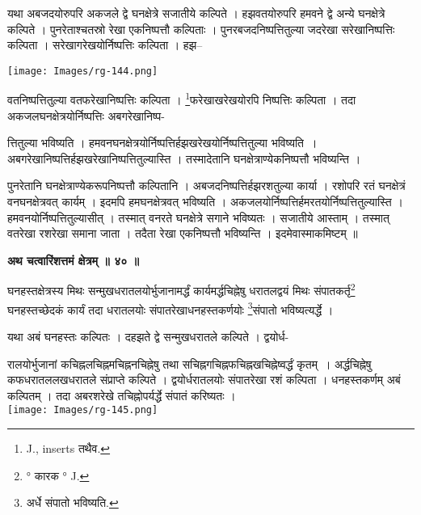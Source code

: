 \documentclass[11pt, openany]{book}
\begin{document}
यथा अबजदयोरुपरि अकजले द्वे घनक्षेत्रे सजातीये कल्पिते ।
हझवतयोरुपरि हमवने द्वे अन्ये घनक्षेत्रे कल्पिते ।
पुनरेताश्चतस्रो रेखा एकनिष्पत्तौ कल्पिताः । पुनरबजदनिष्पत्तितुल्या जदरेखा
सरेखानिष्पत्तिः कल्पिता । सरेखागरेखयोर्निष्पत्तिः कल्पिता । हझ--
\begin{center}
 \texttt{[image: Images/rg-144.png]}  
 \end{center} 
वतनिष्पत्तितुल्या वतफरेखानिष्पत्तिः कल्पिता ।
\renewcommand{\thefootnote}{१}\footnote{{\en J., inserts} तथैव.}फरेखाखरेखयोरपि
निष्पत्तिः कल्पिता । तदा अकजलघनक्षेत्रयोर्निष्पत्तिः अबगरेखानिष्प-

\newpage
\noindent त्तितुल्या भविष्यति । हमवनघनक्षेत्रयोर्निष्पत्तिर्हझखरेखयोर्निष्पत्तितुल्या भविष्यति~। अबगरेखानिष्पत्तिर्हझखरेखानिष्पत्तितुल्यास्ति ।
तस्मादेतानि घनक्षेत्राण्येकनिष्पत्तौ भविष्यन्ति ।\\
\vspace{3mm}

पुनरेतानि घनक्षेत्राण्येकरूपनिष्पत्तौ कल्पितानि । अबजदनिष्पत्तिर्हझरशतुल्या कार्या । रशोपरि रतं घनक्षेत्रं वनघनक्षेत्रवत् कार्यम् । इदमपि हमघनक्षेत्रवत् भविष्यति । अकजलयोर्निष्पत्तिर्हमरतयोर्निष्पत्तितुल्यास्ति । हमवनयोर्निष्पत्तितुल्यासीत् । तस्मात्
वनरते घनक्षेत्रे सगाने भविष्यतः । सजातीये आस्ताम् । तस्मात् वतरेखा रशरेखा समाना जाता । तदैता रेखा एकनिष्पत्तौ भविष्यन्ति । इदमेवास्माकमिष्टम् ॥\\
\vspace{3mm}

\begin{center}
\textbf{\large अथ चत्वारिंशत्तमं क्षेत्रम् ॥ ४० ॥}
\end{center}
\vspace{5mm}

{\ab घनहस्तक्षेत्रस्य मिथः सन्मुखधरातलयोर्भुजानामर्द्धं कार्यमर्द्धचिह्नेषु धरातलद्वयं मिथः संपातकर्तृ\renewcommand{\thefootnote}{१}\footnote{° कारक ° {\en J.}} घनहस्तच्छेदकं कार्यं तदा धरातलयोः संपातरेखाधनहस्तकर्णयोः \renewcommand{\thefootnote}{२}\footnote{अर्धे संपातो भविष्यति.}संपातो भविष्यत्यर्द्धे ।}\\
\vspace{3mm}

यथा अबं घनहस्तः कल्पितः । दहझते द्वे सन्मुखधरातले कल्पिते । द्वयोर्ध-
\begin{vwcol}[widths={0.6,0.4}, sep=.8cm, rule=0pt]
रालयोर्भुजानां कचिह्नलचिह्नमचिह्ननचिह्नेषु तथा सचिह्नगचिह्नफचिह्नखचिह्नेष्वर्द्धं कृतम्~। अर्द्धचिह्नेषु कफधरातललखधरातले संप्राप्ते कल्पिते । द्वयोर्धरातलयोः संपातरेखा रशं कल्पिता । धनहस्तकर्णम् अबं कल्पितम् । तदा अबरशरेखे तचिह्नोपर्यर्द्धे संपातं करिष्यतः ।\\
\noindent  \texttt{[image: Images/rg-145.png]}  
\end{vwcol}
\vspace{5mm}
\end{document}
